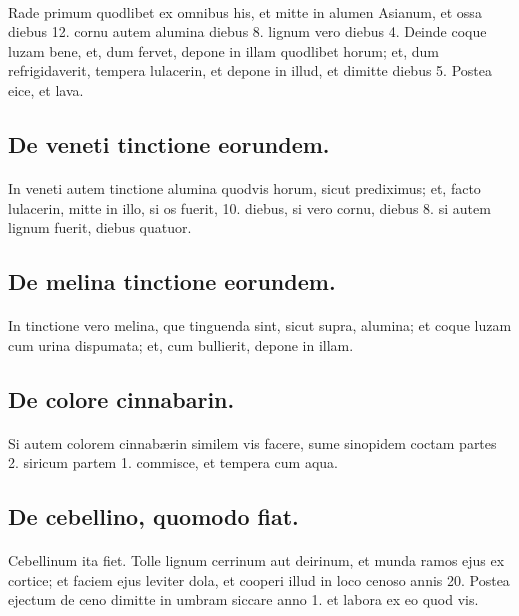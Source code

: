 \documentclass[a4paper, 11pt, oneside, polutonikogreek, italian]{article}
\begin{document}
\paragraph{}
Rade primum quodlibet ex omnibus his, et mitte in alumen Asianum, et ossa diebus 12. cornu autem alumina diebus 8. lignum vero diebus 4. Deinde coque luzam bene, et, dum fervet, depone in illam quodlibet horum; et, dum refrigidaverit, tempera lulacerin, et depone in illud, et dimitte diebus 5. Postea eice, et lava.

\subsection{De veneti tinctione eorundem.}
\paragraph{}
In veneti autem tinctione alumina quodvis horum, sicut prediximus; et, facto lulacerin, mitte in illo, si os fuerit, 10. diebus, si vero cornu, diebus 8. si autem lignum fuerit, diebus quatuor.

\subsection{De melina tinctione eorundem.}
\paragraph{}
In tinctione vero melina, que tinguenda sint, sicut supra, alumina; et coque luzam cum urina dispumata; et, cum bullierit, depone in illam.

\subsection{De colore cinnabarin.}
\paragraph{}
Si autem colorem cinnabærin similem vis facere, sume sinopidem coctam partes 2. siricum partem 1. commisce, et tempera cum aqua.

\subsection{De cebellino, quomodo fiat.}
\paragraph{}
Cebellinum ita fiet. Tolle lignum cerrinum aut deirinum, et munda ramos ejus ex cortice; et faciem ejus leviter dola, et cooperi illud in loco cenoso annis 20. Postea ejectum de ceno dimitte in umbram siccare anno 1. et labora ex eo quod vis.
\end{document}
